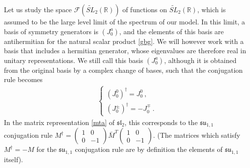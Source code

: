 \documentclass[12pt, a4paper, notitlepage, twoside]{report}
\numberwithin{equation}{section}
\theoremstyle{break}
\begin{document}
Let us study the space $\mathcal{F}(\widetilde{SL}_2(\mathbb{R}))$ of functions on $\widetilde{SL}_2(\mathbb{R})$, which is assumed to be the large level limit of the spectrum of our model. 
In this limit, a basis of symmetry generators is $(J^a_0)$, and the elements of this basis are antihermitian for the natural scalar product \eqref{gbg}.
We will however work with a basis that includes a hermitian generator, whose eigenvalues are therefore real in unitary representations.
We still call this basis $(J^a_0)$, although it is obtained from the original basis by a complex change of bases, such that the conjugation rule becomes
\begin{align}
 \left\{\begin{array}{l} (J_0^0)^\dagger = J_0^0\ , \\
         (J_0^\pm)^\dagger = -J_0^\mp \ .
        \end{array}
\right.
\label{jtdj}
\end{align}
In the matrix representation \eqref{mta} of $\mathfrak{sl}_2$, this corresponds to the $\mathfrak{su}_{1,1}$ conjugation rule $M^\dagger = \left(\begin{smallmatrix} 1 & 0 \\ 0 & -1 \end{smallmatrix}\right) \bar{M}^T \left(\begin{smallmatrix} 1 & 0 \\ 0 & -1 \end{smallmatrix}\right)$. (The matrices which satisfy $M^\dagger =-M$ for the $\mathfrak{su}_{1,1}$ conjugation rule are by definition the elements of $\mathfrak{su}_{1,1}$ itself). 
\end{document}
